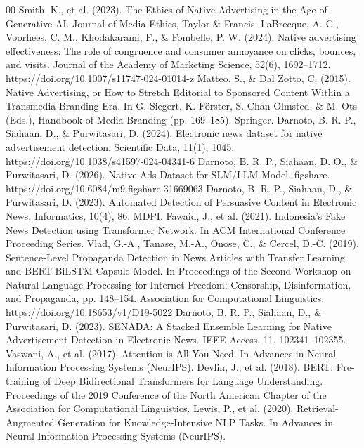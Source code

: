 \documentclass{ieeeaccess}
\begin{document}
\begin{thebibliography}{00}
 Smith, K., et al. (2023). The Ethics of Native Advertising in the Age of Generative AI. Journal of Media Ethics, Taylor \& Francis.
 LaBrecque, A. C., Voorhees, C. M., Khodakarami, F., \& Fombelle, P. W. (2024). Native advertising effectiveness: The role of congruence and consumer annoyance on clicks, bounces, and visits. Journal of the Academy of Marketing Science, 52(6), 1692--1712. https://doi.org/10.1007/s11747-024-01014-z
 Matteo, S., \& Dal Zotto, C. (2015). Native Advertising, or How to Stretch Editorial to Sponsored Content Within a Transmedia Branding Era. In G. Siegert, K. Förster, S. Chan-Olmsted, \& M. Ots (Eds.), Handbook of Media Branding (pp. 169--185). Springer.
 Darnoto, B. R. P., Siahaan, D., \& Purwitasari, D. (2024). Electronic news dataset for native advertisement detection. Scientific Data, 11(1), 1045. https://doi.org/10.1038/s41597-024-04341-6
 Darnoto, B. R. P., Siahaan, D. O., \& Purwitasari, D. (2026). Native Ads Dataset for SLM/LLM Model. figshare. https://doi.org/10.6084/m9.figshare.31669063
 Darnoto, B. R. P., Siahaan, D., \& Purwitasari, D. (2023). Automated Detection of Persuasive Content in Electronic News. Informatics, 10(4), 86. MDPI.
 Fawaid, J., et al. (2021). Indonesia’s Fake News Detection using Transformer Network. In ACM International Conference Proceeding Series.
 Vlad, G.-A., Tanase, M.-A., Onose, C., \& Cercel, D.-C. (2019). Sentence-Level Propaganda Detection in News Articles with Transfer Learning and BERT-BiLSTM-Capsule Model. In Proceedings of the Second Workshop on Natural Language Processing for Internet Freedom: Censorship, Disinformation, and Propaganda, pp. 148--154. Association for Computational Linguistics. https://doi.org/10.18653/v1/D19-5022
 Darnoto, B. R. P., Siahaan, D., \& Purwitasari, D. (2023). SENADA: A Stacked Ensemble Learning for Native Advertisement Detection in Electronic News. IEEE Access, 11, 102341--102355.
 Vaswani, A., et al. (2017). Attention is All You Need. In Advances in Neural Information Processing Systems (NeurIPS).
 Devlin, J., et al. (2018). BERT: Pre-training of Deep Bidirectional Transformers for Language Understanding. Proceedings of the 2019 Conference of the North American Chapter of the Association for Computational Linguistics.
 Lewis, P., et al. (2020). Retrieval-Augmented Generation for Knowledge-Intensive NLP Tasks. In Advances in Neural Information Processing Systems (NeurIPS).

\end{thebibliography}
\end{document}

